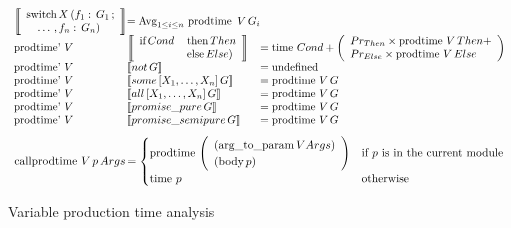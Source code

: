 \begin{algorithm}
\[\begin{array}{l @{}l @{}l}
    \left\llbracket
    \begin{array}{l}
        \hbox{switch}\,X\,(f_1:\,G_1\,; \\
        \quad\ldots\,,f_n:\,G_n)
    \end{array}
    \right\rrbracket &=
    \Avg_{1 \leq i \leq n}\,\prodtime\,V\,G_i \\
\prodtimep V\,& 
    \left\llbracket
    \begin{array}{ll}
        \hbox{if}\,Cond\,&\hbox{then}\,Then \\
                         &\hbox{else}\,Else)
    \end{array}
    \right\rrbracket &= \timef Cond +
    \left(
        \begin{array}{l}
            Pr_{Then} \times \prodtime V\,Then+ \\
            Pr_{Else} \times \prodtime V\,Else
        \end{array}
    \right) \\
\prodtimep V\,& \pat{not\,G}                       &= \undef \\
\prodtimep V\,& \pat{some\,[X_1,\ldots,X_n]\,G}    &= \prodtime V\,G \\
\prodtimep V\,& \pat{all\,[X_1,\ldots,X_n]\,G}     &= \prodtime V\,G \\
\prodtimep V\,& \pat{promise\_pure\,G}             &= \prodtime V\,G \\
\prodtimep V\,& \pat{promise\_semipure\,G}         &= \prodtime V\,G \\
\end{array}
\]
\[
\begin{array}{l @{}l}
\callprodtime V\,p\,Args        \,&=
    \begin{cases}
        \prodtime \left(
        \begin{array}{l}
            (\operatorname{arg\_to\_param} V Args) \\
            (\operatorname{body} p)
        \end{array}
        \right) &
            \text{if } p \text{ is in the current module} \\
        \timef p &
            \text{otherwise}
    \end{cases} \\
\end{array}
\]
\caption{Variable production time analysis}
\label{alg:var_prod_time}
\end{algorithm}

